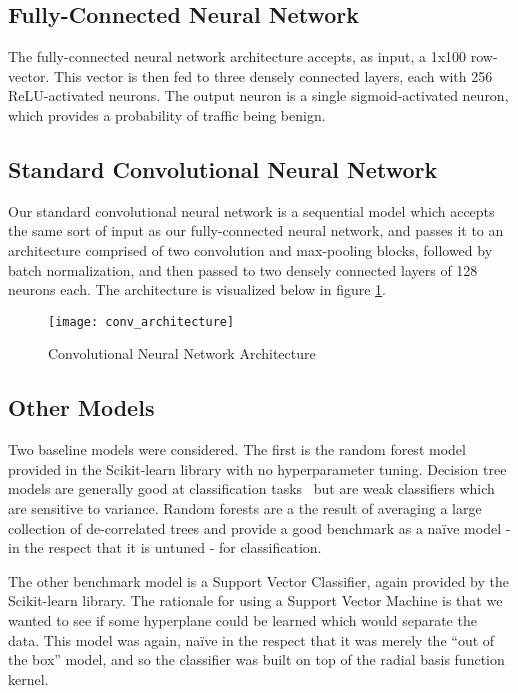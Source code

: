 \subsection{Fully-Connected Neural Network}
The fully-connected neural network architecture accepts, as input, a 1x100 row-vector.
This vector is then fed to three densely connected layers, each with 256 ReLU-activated neurons.
The output neuron is a single sigmoid-activated neuron, which provides a probability of traffic being benign.

\subsection{Standard Convolutional Neural Network}
Our standard convolutional neural network is a sequential model which accepts the same sort of input as our fully-connected neural network, and passes it to an architecture comprised of two convolution and max-pooling blocks, followed by batch normalization, and then passed to two densely connected layers of 128 neurons each. The architecture is visualized below in figure \ref{fig:conv net}.

\begin{figure}[ht]
\caption{Convolutional Neural Network Architecture}
\label{fig:conv net}
\texttt{[image: conv\_architecture]}
\centering
\end{figure}

\subsection{Other Models} \label{other models}
Two baseline models were considered.
The first is the random forest model provided in the Scikit-learn library with no hyperparameter tuning.
Decision tree models are generally good at classification tasks~\cite{hastie01statisticallearning} but are weak classifiers which are sensitive to variance.
Random forests are a the result of averaging a large collection of de-correlated trees and provide a good benchmark as a na\"ive model - in the respect that it is untuned - for classification.

The other benchmark model is a Support Vector Classifier, again provided by the Scikit-learn library.
The rationale for using a Support Vector Machine is that we wanted to see if some hyperplane could be learned which would separate the data.
This model was again, na\"ive in the respect that it was merely the ``out of the box'' model, and so the classifier was built on top of the radial basis function kernel.

